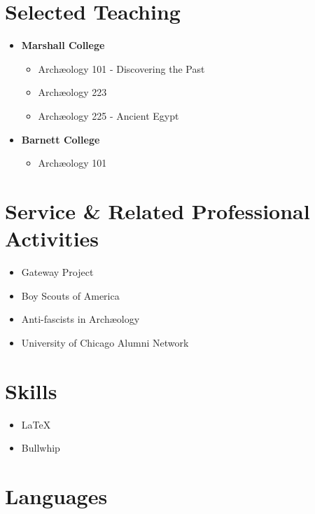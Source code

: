 \documentclass[%
    11pt,
  oneside
  ]{memoir}
\let\oldsection\section
\renewcommand{\section}[1]{%
  \oldsection{#1}
  \leavevmode
  \par
  \vspace{\dimexpr-\baselineskip-\parskip}
}
\begin{document}
\hypertarget{selected-teaching}{%
\section{Selected Teaching}\label{selected-teaching}}

\begin{itemize}
\tightlist
\item
  \textbf{Marshall College}

  \begin{itemize}
  \tightlist
  \item
    Archæology 101 - Discovering the Past
  \item
    Archæology 223
  \item
    Archæology 225 - Ancient Egypt
  \end{itemize}
\item
  \textbf{Barnett College}

  \begin{itemize}
  \tightlist
  \item
    Archæology 101
  \end{itemize}
\end{itemize}

\hypertarget{service-related-professional-activities}{%
\section{Service \& Related Professional
Activities}\label{service-related-professional-activities}}

\begin{itemize}
\tightlist
\item
  Gateway Project
\item
  Boy Scouts of America
\item
  Anti-fascists in Archæology
\item
  University of Chicago Alumni Network
\end{itemize}

\hypertarget{skills}{%
\section{Skills}\label{skills}}

\begin{itemize}
\tightlist
\item
  \LaTeX
\item
  Bullwhip
\end{itemize}

\hypertarget{languages}{%
\section{Languages}\label{languages}}
\end{document}
